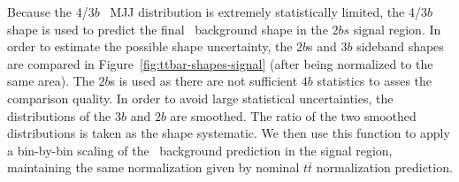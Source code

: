 
Because the 4/3$b$ \ttbar\ MJJ distribution is extremely statistically limited, the 4/3$b$ shape is used to predict the final \ttbar\ background shape in the $2bs$ signal region. In order to estimate the possible shape uncertainty, the $2b$s and $3b$ sideband shapes are compared in Figure~\ref{fig:ttbar-shapes-signal} (after being normalized to the same area).  The $2b$s is used as there are not sufficient $4b$ statistics to asses the comparison quality. In order to avoid large statistical uncertainties, the distributions of the $3b$ and $2b$ are smoothed. The ratio of the two smoothed distributions is taken as the shape systematic. We then use this function to apply a bin-by-bin scaling of the \ttbar\ background prediction in the signal region, maintaining the same normalization given by nominal $t\bar{t}$ normalization prediction.

